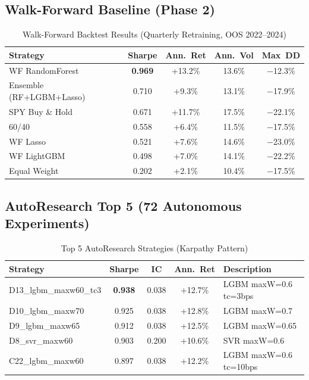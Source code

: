\documentclass[12pt]{article}
\begin{document}
\subsection{Walk-Forward Baseline (Phase 2)}
\begin{table}[H]\centering
\caption{Walk-Forward Backtest Results (Quarterly Retraining, OOS 2022--2024)}\label{tab:wf}
\begin{tabular}{lcccc}\toprule
Strategy & Sharpe & Ann.~Ret & Ann.~Vol & Max~DD \\\midrule
WF RandomForest & \textbf{0.969} & +13.2\% & 13.6\% & $-$12.3\% \\
Ensemble (RF+LGBM+Lasso) & 0.710 & +9.3\% & 13.1\% & $-$17.9\% \\
SPY Buy \& Hold & 0.671 & +11.7\% & 17.5\% & $-$22.1\% \\
60/40 & 0.558 & +6.4\% & 11.5\% & $-$17.5\% \\
WF Lasso & 0.521 & +7.6\% & 14.6\% & $-$23.0\% \\
WF LightGBM & 0.498 & +7.0\% & 14.1\% & $-$22.2\% \\
Equal Weight & 0.202 & +2.1\% & 10.4\% & $-$17.5\% \\
\bottomrule\end{tabular}\end{table}

\subsection{AutoResearch Top 5 (72 Autonomous Experiments)}
\begin{table}[H]\centering
\caption{Top 5 AutoResearch Strategies (Karpathy Pattern)}\label{tab:autoresearch}
\begin{tabular}{lcccl}\toprule
Strategy & Sharpe & IC & Ann.~Ret & Description \\\midrule
D13\_lgbm\_maxw60\_tc3 & \textbf{0.938} & 0.038 & +12.7\% & LGBM maxW=0.6 tc=3bps \\
D10\_lgbm\_maxw70 & 0.925 & 0.038 & +12.8\% & LGBM maxW=0.7 \\
D9\_lgbm\_maxw65 & 0.912 & 0.038 & +12.5\% & LGBM maxW=0.65 \\
D8\_svr\_maxw60 & 0.903 & 0.200 & +10.6\% & SVR maxW=0.6 \\
C22\_lgbm\_maxw60 & 0.897 & 0.038 & +12.2\% & LGBM maxW=0.6 tc=10bps \\
\bottomrule\end{tabular}\end{table}
\end{document}
